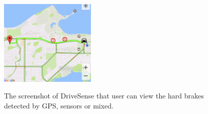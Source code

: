 \begin{figure}[th]
\begin{center}
\includegraphics[width=1.8in, angle=0]{Figs/DriveSense/cut_app.png}
	\vspace{0.0cm}
\caption{The screenshot of DriveSense that user can view the hard brakes
	detected by GPS, sensors or mixed. }
\vspace{-0.2cm}
\label{xsense_app}
\end{center}
\end{figure}



